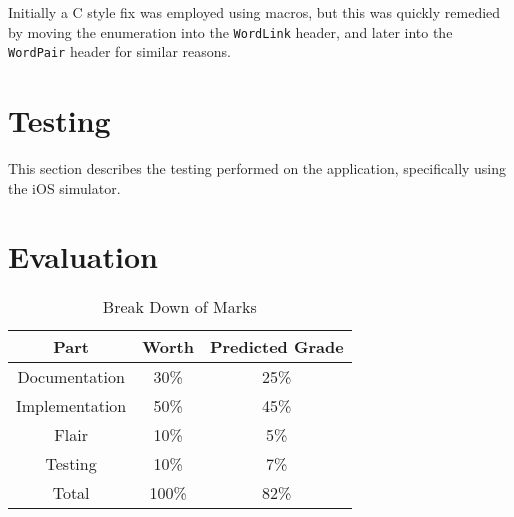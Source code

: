 \documentclass[11pt, a4paper]{article}
\begin{document}
Initially a C style fix was employed using macros, but this was quickly remedied by moving the enumeration into the \texttt{WordLink} header, and later into the \texttt{WordPair} header for similar reasons.


\section{Testing}

This section describes the testing performed on the application, specifically using the iOS simulator.


\section{Evaluation}


\begin{table}[h]
\centering
\begin{tabular}{|c|c|c|}\hline
\textbf{Part} & \textbf{Worth} & \textbf{Predicted Grade} \\ \hline
Documentation & 30\% & 25\% \\ 
Implementation & 50\% & 45\% \\ 
Flair & 10\% & 5\% \\ 
Testing & 10\% & 7\% \\ \hline
Total & 100\% & 82\% \\ \hline
\end{tabular}
\caption{Break Down of Marks}\label{tab:marks}
\end{table}

\newpage
\end{document}
